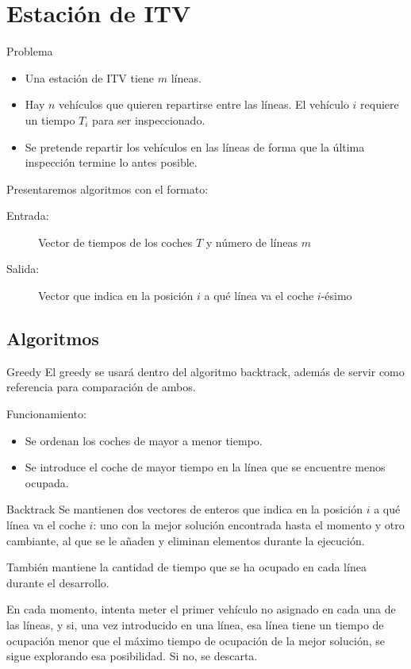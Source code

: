\section{Estación de ITV}

\begin{frame}{Problema}
\begin{itemize}
	\item Una estación de ITV tiene $m$ líneas.
	\pause
	\item Hay $n$ vehículos que quieren repartirse entre las líneas. El vehículo $i$
	requiere un tiempo $T_i$ para ser inspeccionado.
	\pause
	\item Se pretende repartir los vehículos en las líneas de forma que la última
	inspección termine lo antes posible.
\end{itemize}
\pause

Presentaremos algoritmos con el formato:
\begin{description}
 \item[Entrada:] Vector de tiempos de los coches $T$ y número de líneas $m$
 \item[Salida:] Vector que indica en la posición $i$ a qué línea va el coche $i$-ésimo
\end{description}
\end{frame}

\subsection{Algoritmos}

\begin{frame}{Greedy}
	El greedy se usará dentro del algoritmo backtrack, además de servir como referencia para comparación de ambos.
	
	\pause
	
	Funcionamiento:
	\begin{itemize}
		\item Se ordenan los coches de mayor a menor tiempo.
		\item Se introduce el coche de mayor tiempo en la línea que se encuentre menos ocupada.
	\end{itemize}
\end{frame}

\begin{frame}{Backtrack}
	Se mantienen dos vectores de enteros que indica en la posición $i$ a qué línea va el coche $i$: uno con la mejor solución encontrada hasta el momento y otro cambiante, al que se le añaden y eliminan elementos durante la ejecución.
	
	También mantiene la cantidad de tiempo que se ha ocupado en cada línea durante el desarrollo.
	
	\pause
	
	En cada momento, intenta meter el primer vehículo no asignado en cada una de las líneas, y si, una vez introducido en una línea, esa línea tiene un tiempo de ocupación menor que el máximo tiempo de ocupación de la mejor solución, se sigue explorando esa posibilidad. Si no, se descarta.
\end{frame}

